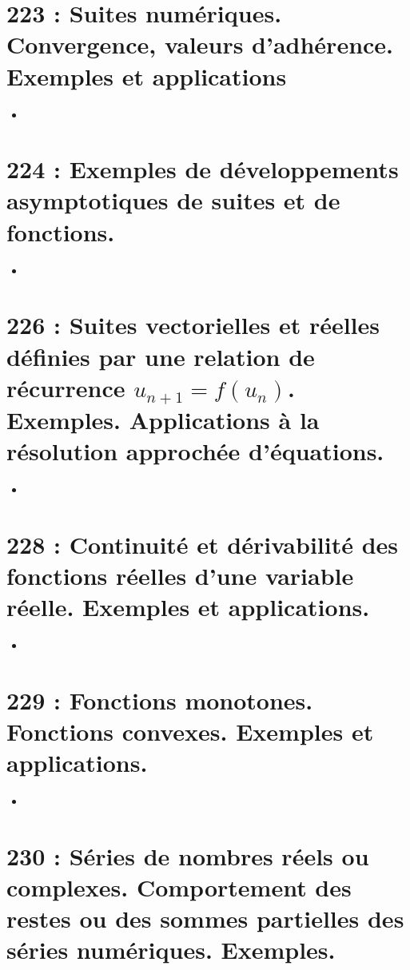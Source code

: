 \documentclass[a4paper,10pt,oneside,twocolumn,landscape]{book}
\begin{document}
\section{223 : Suites numériques. Convergence, valeurs d’adhérence. Exemples et applications}

\begin{itemize}
\item 
\end{itemize}


\section{224 : Exemples de développements asymptotiques de suites et de fonctions.}

\begin{itemize}
	\item 
\end{itemize}

\section{226 : Suites vectorielles et réelles définies par une relation de récurrence $u_{n+1} = f(u_n)$. Exemples. Applications à la résolution approchée d’équations.}

\begin{itemize}
	\item 
\end{itemize}

\section{228 : Continuité et dérivabilité des fonctions réelles d’une variable réelle. Exemples et applications.}

\begin{itemize}
	\item 
\end{itemize}

\section{229 : Fonctions monotones. Fonctions convexes. Exemples et applications.}

\begin{itemize}
	\item 
\end{itemize}

\section{230 : Séries de nombres réels ou complexes. Comportement des restes ou des sommes partielles des séries numériques. Exemples.}
\end{document}
